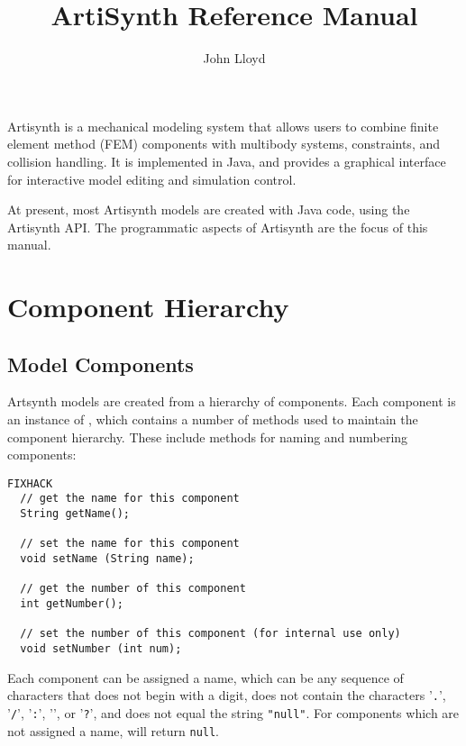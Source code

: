 \documentclass{article}
\title{ArtiSynth Reference Manual}
\author{John Lloyd}
\date{}
\begin{document}
\maketitle

\iflatexml{\large\today}\fi

\tableofcontents

Artisynth is a mechanical modeling system that allows users to combine
finite element method (FEM) components with multibody systems,
constraints, and collision handling. It is implemented in Java, and
provides a graphical interface for interactive model editing and
simulation control.

At present, most Artisynth models are created with Java code, using the
Artisynth API. The programmatic aspects of Artisynth are the focus of
this manual.


\section{Component Hierarchy}
\label{ComponentHierarchy}

\subsection{Model Components}

Artsynth models are created from a hierarchy of components. Each
component is an instance of , which contains 
a number of methods used to maintain the component hierarchy.
These include methods for naming and numbering components:

\begin{lstlisting}FIXHACK
  // get the name for this component
  String getName();

  // set the name for this component
  void setName (String name);

  // get the number of this component
  int getNumber();

  // set the number of this component (for internal use only)
  void setNumber (int num);
\end{lstlisting}

Each component can be assigned a name, which can be any sequence of
characters that does not begin with a digit, does not contain the
characters '{\tt .}', '{\tt /}', '{\tt :}', '{\tt *}', or '{\tt ?}',
and does not equal the string {\tt "null"}.
For components which are not assigned a name,
 will return {\tt null}.
\end{document}
